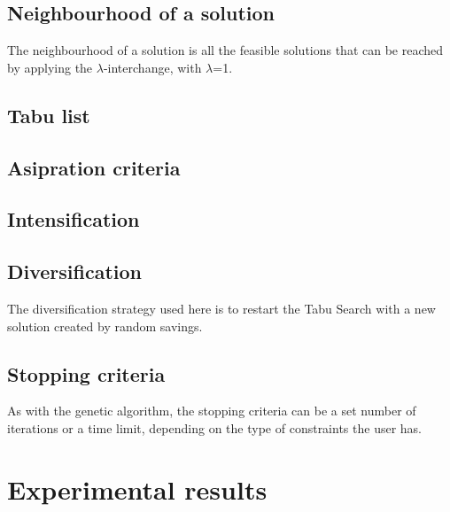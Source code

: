 \documentclass{article} %
\begin{document}
\subsection{Neighbourhood of a solution}

The neighbourhood of a solution is all the feasible solutions that can be reached by applying the $\lambda$-interchange, with $\lambda$=1.


\subsection{Tabu list}



\subsection{Asipration criteria}



\subsection{Intensification}



\subsection{Diversification}

The diversification strategy used here is to restart the Tabu Search with a new solution created by random savings.


\subsection{Stopping criteria}

As with the genetic algorithm, the stopping criteria can be a set number of iterations or a time limit, depending on the type of constraints the user has.


\newpage
\section{Experimental results}
\label{exp_results}

\end{document}
